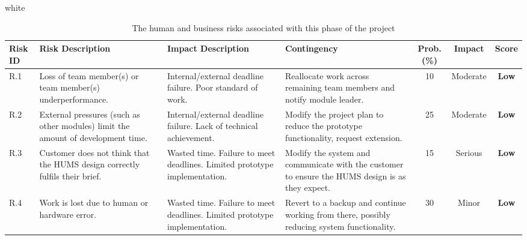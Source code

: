 \documentclass[10pt,a4paper]{article}
\newcommand{\tableformat}[4]{
\begin{table}[H]
\centering
  \rowcolors{2}{gray!10} {white}
\begin{tabular}{#1}
  \hline
  \rowcolor[gray]{0.9} #2
\end{tabular}
\caption{#3}
\label{#4}
\end{table}}
\begin{document}
\tableformat{p{0.8cm} p{3cm} p{3cm} p{3cm} c c c }
{ 	\hline
  	Risk ID & Risk Description & Impact Description & Contingency & Prob.(\%) & Impact & Score \\
  	\hline
  
    R.1 & Loss of team member(s) or team member(s) underperformance. & Internal/external deadline failure. Poor standard of work. & Reallocate work across remaining team members and notify module leader. & 10 & Moderate & \textbf{Low} \\
    R.2 & External pressures (such as other modules) limit the amount of development time. & Internal/external deadline failure. Lack of technical achievement. & Modify the project plan to reduce the prototype functionality, request extension. & 25 & Moderate &  \textbf{Low} \\
    R.3 & Customer does not think that the HUMS design correctly fulfils their brief. & Wasted time. Failure to meet deadlines. Limited prototype implementation. & Modify the system and communicate with the customer to ensure the HUMS design is as they expect. & 15 & Serious &  \textbf{Low} \\
    R.4 & Work is lost due to human or hardware error. & Wasted time. Failure to meet deadlines. Limited prototype implementation. & Revert to a backup and continue working from there, possibly reducing system functionality. & 30 & Minor &  \textbf{Low} \\
  	\hline
}
{The human and business risks associated with this phase of the project}{tab:human_risks}
\end{document}
